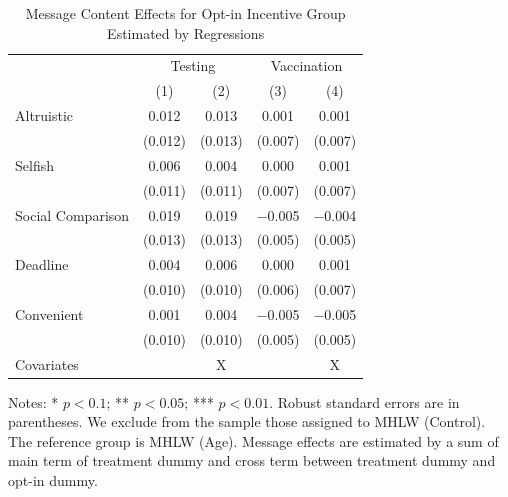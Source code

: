 \documentclass[
]{article}
\begin{document}
\begin{table}

\caption{\label{tab:lh-act-woA}Message Content Effects for Opt-in Incentive Group Estimated by Regressions}
\centering
\fontsize{9}{11}\selectfont
\begin{threeparttable}
\begin{tabular}[t]{lcccc}
\toprule
\multicolumn{1}{c}{ } & \multicolumn{2}{c}{Testing} & \multicolumn{2}{c}{Vaccination} \\
\cmidrule(l{3pt}r{3pt}){2-3} \cmidrule(l{3pt}r{3pt}){4-5}
  & (1) & (2) & (3) & (4)\\
\midrule
Altruistic & \num{0.012} & \num{0.013} & \num{0.001} & \num{0.001}\\
 & (\num{0.012}) & (\num{0.013}) & (\num{0.007}) & (\num{0.007})\\
Selfish & \num{0.006} & \num{0.004} & \num{0.000} & \num{0.001}\\
 & (\num{0.011}) & (\num{0.011}) & (\num{0.007}) & (\num{0.007})\\
Social Comparison & \num{0.019} & \num{0.019} & \num{-0.005} & \num{-0.004}\\
 & (\num{0.013}) & (\num{0.013}) & (\num{0.005}) & (\num{0.005})\\
Deadline & \num{0.004} & \num{0.006} & \num{0.000} & \num{0.001}\\
 & (\num{0.010}) & (\num{0.010}) & (\num{0.006}) & (\num{0.007})\\
Convenient & \num{0.001} & \num{0.004} & \num{-0.005} & \num{-0.005}\\
 & (\num{0.010}) & (\num{0.010}) & (\num{0.005}) & (\num{0.005})\\
Covariates &  & X &  & X\\
\bottomrule
\end{tabular}
\begin{tablenotes}
\item Notes: * $p < 0.1$; ** $p < 0.05$; *** $p < 0.01$. Robust standard errors are in parentheses. We exclude from the sample those assigned to MHLW (Control). The reference group is MHLW (Age). Message effects are estimated by a sum of main term of treatment dummy and cross term between treatment dummy and opt-in dummy.
\end{tablenotes}
\end{threeparttable}
\end{table}
\end{document}

